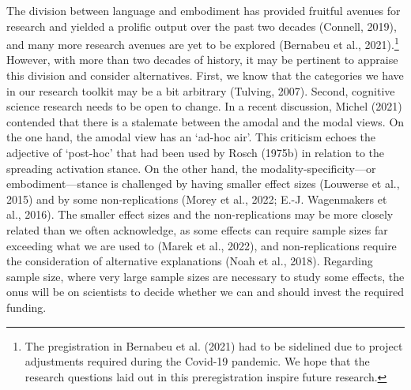 \documentclass[
  12pt,
  man,floatsintext]{apa7}
\begin{document}
The division between language and embodiment has provided fruitful avenues for research and yielded a prolific output over the past two decades (Connell, 2019), and many more research avenues are yet to be explored (Bernabeu et al., 2021).\footnote{The pregistration in Bernabeu et al. (2021) had to be sidelined due to project adjustments required during the Covid-19 pandemic. We hope that the research questions laid out in this preregistration inspire future research.} However, with more than two decades of history, it may be pertinent to appraise this division and consider alternatives. First, we know that the categories we have in our research toolkit may be a bit arbitrary (Tulving, 2007). Second, cognitive science research needs to be open to change. In a recent discussion, Michel (2021) contended that there is a stalemate between the amodal and the modal views. On the one hand, the amodal view has an `ad-hoc air'. This criticism echoes the adjective of `post-hoc' that had been used by Rosch (1975b) in relation to the spreading activation stance. On the other hand, the modality-specificity---or embodiment---stance is challenged by having smaller effect sizes (Louwerse et al., 2015) and by some non-replications (Morey et al., 2022; E.-J. Wagenmakers et al., 2016). The smaller effect sizes and the non-replications may be more closely related than we often acknowledge, as some effects can require sample sizes far exceeding what we are used to (Marek et al., 2022), and non-replications require the consideration of alternative explanations (Noah et al., 2018). Regarding sample size, where very large sample sizes are necessary to study some effects, the onus will be on scientists to decide whether we can and should invest the required funding.
\end{document}
